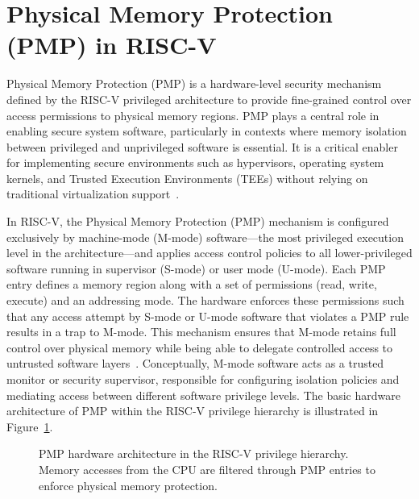 \section{Physical Memory Protection (PMP) in RISC-V}
\label{sec:pmp}

Physical Memory Protection (PMP) is a hardware-level security mechanism defined by the RISC-V privileged architecture to provide fine-grained control over access permissions to physical memory regions. PMP plays a central role in enabling secure system software, particularly in contexts where memory isolation between privileged and unprivileged software is essential. It is a critical enabler for implementing secure environments such as hypervisors, operating system kernels, and Trusted Execution Environments (TEEs) without relying on traditional virtualization support~\cite{riscvprivspec}.

In RISC-V, the Physical Memory Protection (PMP) mechanism is configured exclusively by machine-mode (M-mode) software—the most privileged execution level in the architecture—and applies access control policies to all lower-privileged software running in supervisor (S-mode) or user mode (U-mode). Each PMP entry defines a memory region along with a set of permissions (read, write, execute) and an addressing mode. The hardware enforces these permissions such that any access attempt by S-mode or U-mode software that violates a PMP rule results in a trap to M-mode. This mechanism ensures that M-mode retains full control over physical memory while being able to delegate controlled access to untrusted software layers~\cite{riscvprivspec,Lee2019}. Conceptually, M-mode software acts as a trusted monitor or security supervisor, responsible for configuring isolation policies and mediating access between different software privilege levels.
The basic hardware architecture of PMP within the RISC-V privilege hierarchy is illustrated in Figure~\ref{fig:pmp-arch}.

\begin{figure}[htbp]
\centering
{}
\caption{PMP hardware architecture in the RISC‑V privilege hierarchy. Memory accesses from the CPU are filtered through PMP entries to enforce physical memory protection.}
\label{fig:pmp-arch}
\end{figure}


